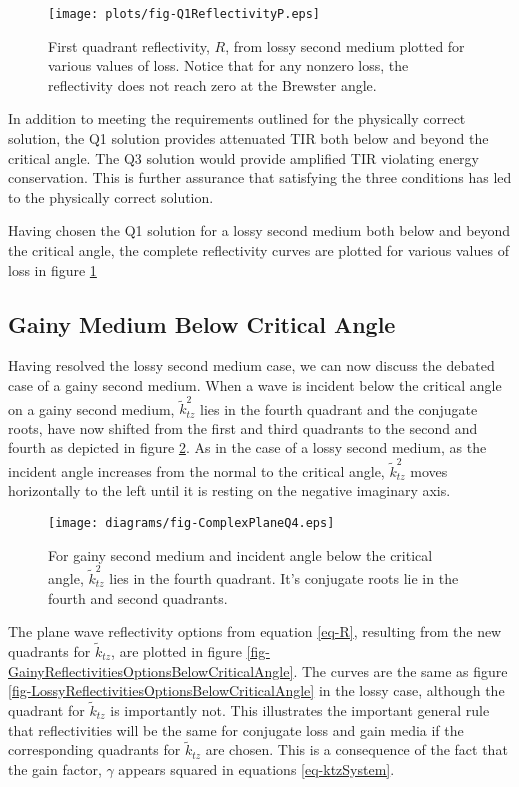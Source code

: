 \documentclass[12pt]{uthesis-v12}
\begin{document}
\begin{figure}[ht]
\centering
  \texttt{[image: plots/fig-Q1ReflectivityP.eps]}
\caption[Reflectivity, $R$, from lossy medium at various losses.]{First quadrant reflectivity, $R$, from lossy second medium plotted for various values of loss. Notice that for any nonzero loss, the reflectivity does not reach zero at the Brewster angle.\label{fig-Q1ReflectivityP}} 
\end{figure}

In addition to meeting the requirements outlined for the physically correct solution, the Q1 solution provides attenuated TIR  both below and beyond the critical angle. The Q3 solution would provide amplified TIR violating energy conservation. This is further assurance that satisfying the three conditions has led to the physically correct solution.

Having chosen the Q1 solution for a lossy second medium both below and beyond the critical angle, the complete reflectivity curves are plotted for various values of loss in figure \ref{fig-Q1ReflectivityP}

\subsection{Gainy Medium Below Critical Angle}
Having resolved the lossy second medium case, we can now discuss the debated case of a gainy second medium. When a wave is incident below the critical angle on a gainy second medium, $\tilde{k}_{tz}^2$ lies in the fourth quadrant and the conjugate roots, have now shifted from the first and third quadrants to the second and fourth as depicted in figure \ref{fig-complexQ4}. As in the case of a lossy second medium, as the incident angle increases from the normal to the critical angle,  $\tilde{k}_{tz}^2$ moves horizontally to the left until it is resting on the negative imaginary axis.

\begin{figure}[htb]
\centering
  \texttt{[image: diagrams/fig-ComplexPlaneQ4.eps]}
\caption[$\tilde{k}_{tz}^2$ complex plane diagram, $\gamma>0$, $\theta_i<\theta_c$]{For gainy second medium and incident angle below the critical angle, $\tilde{k}_{tz}^2$ lies in the fourth quadrant. It's conjugate roots lie in the fourth and second quadrants.
 \label{fig-complexQ4}} 
\end{figure}

The  plane wave reflectivity options from equation \ref{eq-R}, resulting from the new quadrants for $\tilde{k}_{tz}$, are plotted in figure \ref{fig-GainyReflectivitiesOptionsBelowCriticalAngle}. The curves are the same as figure \ref{fig-LossyReflectivitiesOptionsBelowCriticalAngle} in the lossy case, although the quadrant for $\tilde{k}_{tz}$ is importantly not. This illustrates the important general rule that reflectivities will be the same for conjugate loss and gain media if the corresponding quadrants for $\tilde{k}_{tz}$ are chosen. This is a consequence of the fact that the gain factor, $\gamma$ appears squared in equations \ref{eq-ktzSystem}.
\end{document}
